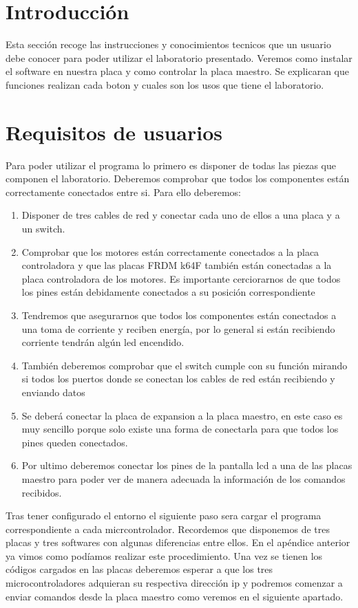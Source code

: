 
\section{Introducción}
Esta sección recoge las instrucciones y conocimientos tecnicos que un usuario debe conocer para poder utilizar el laboratorio presentado.
Veremos como instalar el software en nuestra placa y como controlar la placa maestro. Se explicaran que funciones realizan cada boton y cuales son los usos que tiene el laboratorio.

\section{Requisitos de usuarios}

Para poder utilizar el programa lo primero es disponer de todas las piezas que componen el laboratorio.
Deberemos comprobar que todos los componentes están correctamente conectados entre si. Para ello deberemos:
\begin{enumerate}
\item Disponer de tres cables de red y conectar cada uno de ellos a una placa y a un switch.
\item Comprobar que los motores están correctamente conectados a la placa controladora y que las placas FRDM k64F también están conectadas a la placa controladora de los motores. Es importante cerciorarnos de que todos los pines están debidamente conectados a su posición  correspondiente
\item Tendremos que asegurarnos que todos los componentes están conectados a una toma de corriente y reciben energía, por lo general si están recibiendo corriente tendrán algún led encendido.
\item También deberemos comprobar que el switch cumple con su función mirando si todos los puertos donde se conectan los cables de red están recibiendo y enviando datos
\item Se deberá conectar la placa de expansion a la placa maestro, en este caso es muy sencillo porque solo existe una forma de conectarla para que todos los pines queden conectados.
\item Por ultimo deberemos conectar los pines de la pantalla lcd a una de las placas maestro para poder ver de manera adecuada la información de los comandos recibidos.
\end{enumerate}

Tras tener configurado el entorno el siguiente paso sera cargar el programa correspondiente a cada micrcontrolador. Recordemos que disponemos de tres placas y tres softwares con algunas diferencias entre ellos. En el apéndice anterior ya vimos como podíamos realizar este procedimiento.
Una vez se tienen los códigos cargados en las placas deberemos esperar a que los tres microcontroladores adquieran su respectiva dirección ip y podremos comenzar a enviar comandos desde la placa maestro como veremos en el siguiente apartado.




